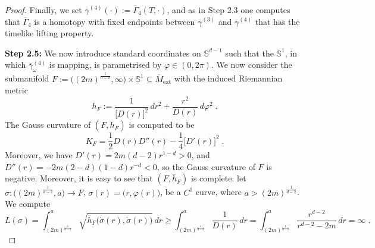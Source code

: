 \documentclass[reqno]{article}
\newcommand{\Sd}{\mathbb{S}^{d-1}}
\newcommand{\ovg}{\overline{\gamma}}
\newcommand{\oMe}{\overline{M}_\mathrm{ext}}
\begin{document}
\begin{proof}
Finally, we set $\ovg^{(4)}(\cdot):= \overline{\Gamma}_4(T, \cdot)$, and as in Step 2.3 one computes that $\overline{\Gamma}_4$ is a homotopy with fixed endpoints between $\ovg^{(3)}$ and $\ovg^{(4)}$ that has the timelike lifting property.
\vspace*{2mm}

\textbf{Step 2.5:} We now introduce standard coordinates on $\Sd$ such that the $\mathbb{S}^1$, in which $\ovg_\omega^{(4)}$ is mapping, is parametrised by $\varphi \in (0, 2\pi)$. We now consider the submanifold $F:= \big((2m)^{\frac{1}{d-2}}, \infty\big) \times \mathbb{S}^1 \subseteq \oMe$ with the induced Riemannian metric
\begin{equation*}
\overline{h}_F := \frac{1}{\big[D(r)\big]^2} \, dr^2 + \frac{r^2}{D(r)} \, d\varphi^2 \;.
\end{equation*}
The Gauss curvature of $(F, \overline{h}_F)$ is computed to be
\begin{equation*}
K_F =  \frac{1}{2} D(r) D''(r) - \frac{1}{4} \big[ D'(r)\big]^2 \;.
\end{equation*}
Moreover, we have $D'(r) = 2m (d-2) r^{1-d} >0$, and $D''(r) =-2m (2-d)(1-d)r^{-d} <0$, so the Gauss curvature of $F$ is negative. Moreover, it is easy to see that $(F, \overline{h}_F)$ is complete: let $\sigma : \big( (2m)^{\frac{1}{d-2}} , a\big) \to F$, $\sigma(r) = \big( r, \varphi(r)\big)$, be a $C^1$ curve, where $a >  (2m)^{\frac{1}{d-2}}$. We compute
\begin{equation*}
L(\sigma) = \int^a_{(2m)^{\frac{1}{d-2}}} \sqrt{ \overline{h}_F \big( \dot{\sigma}(r), \dot{\sigma}(r)\big)} \, dr \geq \int^a_{(2m)^{\frac{1}{d-2}}}  \frac{1}{D(r)} \, dr = \int^a_{(2m)^{\frac{1}{d-2}}}  \frac{r^{d-2}}{r^{d-2} - 2m} \, dr = \infty \;.
\end{equation*}


\end{proof}
\end{document}
